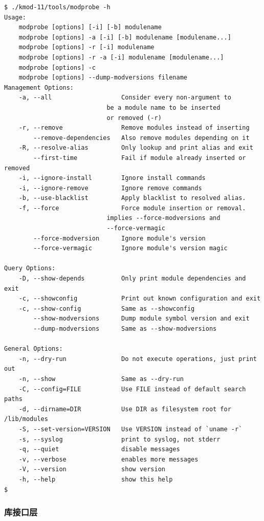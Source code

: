 \documentclass[11pt,a4paper]{article}
\begin{document}
{\begin{shaded}\begin{verbatim}
$ ./kmod-11/tools/modprobe -h
Usage:
    modprobe [options] [-i] [-b] modulename
    modprobe [options] -a [-i] [-b] modulename [modulename...]
    modprobe [options] -r [-i] modulename
    modprobe [options] -r -a [-i] modulename [modulename...]
    modprobe [options] -c
    modprobe [options] --dump-modversions filename
Management Options:
    -a, --all                   Consider every non-argument to
                            be a module name to be inserted
                            or removed (-r)
    -r, --remove                Remove modules instead of inserting
        --remove-dependencies   Also remove modules depending on it
    -R, --resolve-alias         Only lookup and print alias and exit
        --first-time            Fail if module already inserted or removed
    -i, --ignore-install        Ignore install commands
    -i, --ignore-remove         Ignore remove commands
    -b, --use-blacklist         Apply blacklist to resolved alias.
    -f, --force                 Force module insertion or removal.
                            implies --force-modversions and
                            --force-vermagic
        --force-modversion      Ignore module's version
        --force-vermagic        Ignore module's version magic

Query Options:
    -D, --show-depends          Only print module dependencies and exit
    -c, --showconfig            Print out known configuration and exit
    -c, --show-config           Same as --showconfig
        --show-modversions      Dump module symbol version and exit
        --dump-modversions      Same as --show-modversions

General Options:
    -n, --dry-run               Do not execute operations, just print out
    -n, --show                  Same as --dry-run
    -C, --config=FILE           Use FILE instead of default search paths
    -d, --dirname=DIR           Use DIR as filesystem root for /lib/modules
    -S, --set-version=VERSION   Use VERSION instead of `uname -r`
    -s, --syslog                print to syslog, not stderr
    -q, --quiet                 disable messages
    -v, --verbose               enables more messages
    -V, --version               show version
    -h, --help                  show this help
$ 
\end{verbatim}\end{shaded}}
\subsubsection{库接口层}
\end{document}
